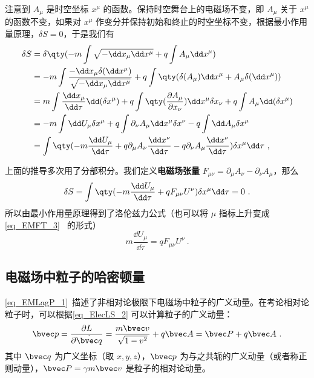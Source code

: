 注意到 $A_\mu$ 是时空坐标 $x^\mu$ 的函数。保持时空舞台上的电磁场不变，即 $A_\mu$ 关于 $x^\mu$ 的函数不变，如果对 $x^\mu$ 作变分并保持初始和终止的时空坐标不变，根据最小作用量原理，$\delta S=0$，于是我们有
\begin{equation}
\begin{aligned}
\delta S&=\delta\qty( -m\int \sqrt{-\dd x_\mu \dd x^\mu} +q\int A_\mu \dd x^\mu)\\
&=-m\int \frac{-\dd x_\mu \delta (\dd x^\mu)}{\sqrt{-\dd x_\mu \dd x^\mu}}+q\int \qty(\delta(A_\mu)\dd x^\mu + A_\mu \delta(\dd x^\mu))\\
&=m\int \frac{\dd x_\mu}{\dd \tau}\dd(\delta x^\mu)+q\int\qty(\frac{\partial A_\mu}{\partial x_\nu})\dd x^\mu \delta x_\nu+q\int A_\mu \dd(\delta x^\mu)\\
&=-m\int\dd U_\mu \delta x^\mu+q\int \partial_\nu A_\mu \dd x^\mu\delta x^\nu-q\int \dd A_\mu \delta x^\mu\\
&=\int \qty(-m\frac{\dd U_\mu}{\dd \tau} + q\partial_\mu A_\nu \frac{\dd x^\nu}{\dd \tau}-q\partial_\nu A_\mu\frac{\dd x^\nu}{\dd \tau})\delta x^\mu\dd \tau~,\\
\end{aligned}
\end{equation}

上面的推导多次用了分部积分。我们定义\textbf{电磁场张量} $F_{\mu\nu}=\partial_{\mu}A_\nu-\partial_\nu A_\mu$，那么
\begin{equation}
\delta S=\int\qty(-m\frac{\dd U_\mu}{\dd \tau}+qF_{\mu\nu}U^\nu)\delta x^\mu \dd \tau=0~.
\end{equation}
所以由最小作用量原理得到了洛伦兹力公式（也可以将 $\mu$ 指标上升变成 \autoref{eq_EMFT_3}~ 的形式）
\begin{equation}
m\frac{\dd U_\mu}{\dd \tau}=qF_{\mu\nu} U^\nu~.
\end{equation}
\subsection{电磁场中粒子的哈密顿量}
\autoref{eq_EMLagP_1}~描述了非相对论极限下电磁场中粒子的广义动量。在考论相对论粒子时，可以根据\autoref{eq_ElecLS_2} 可以计算粒子的广义动量：
\begin{equation}
\bvec p=\frac{\partial L}{\partial \dot {\bvec q}}=\frac{m\bvec v}{\sqrt{1-v^2}}+q\bvec A=\bvec P+q\bvec A~.
\end{equation}
其中 $\bvec q$ 为广义坐标（取 $x,y,z$），$\bvec p$ 为与之共轭的广义动量（或者称正则动量），$\bvec P=\gamma m\bvec v$ 是粒子的相对论动量。

